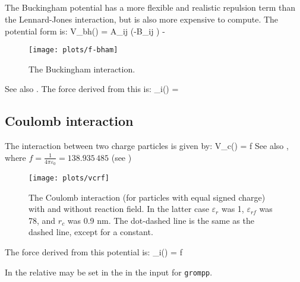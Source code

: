 \subsection{}
The Buckingham
potential has a more flexible and realistic repulsion term
than the Lennard-Jones interaction, but is also more expensive to
compute. The potential form is:
\beq
V_{bh}(\rij) = A_{ij} \exp(-B_{ij} \rij) -
\eeq
\begin{figure}
\centerline{\texttt{[image: plots/f-bham]}}
\caption {The Buckingham interaction.}
\label{fig:bham}
\end{figure}

See also .  The force derived from this is:
\beq
 _i(\rij) =  \rnorm
\eeq


\subsection{Coulomb interaction}
\label{sec:coul}
\newcommand{\epsr}{\varepsilon_r}
\newcommand{\epsrf}{\varepsilon_{rf}}
The  interaction between two charge particles is given by:
\beq
V_c(\rij) = f \frac{q_i q_j}{\epsr \rij}
\label{eqn:vcoul}
\eeq
See also , where $f = \frac{1}{4\pi \varepsilon_0} =
138.935\,485$ (see )

\begin{figure}
\centerline{\texttt{[image: plots/vcrf]}}
\caption[The Coulomb interaction with and without reaction field.]{The
Coulomb interaction (for particles with equal signed charge) with and
without reaction field. In the latter case $\epsr$ was 1, $\epsrf$ was 78,
and $r_c$ was 0.9 nm.
The dot-dashed line is the same as the dashed line, except for a constant.}
\label{fig:coul}
\end{figure}

The force derived from this potential is:
\beq
{}_i(\rvij) = f \frac{q_i q_j}{\epsr\rij^2}\rnorm
\eeq

In {\gromacs} the  relative  
\normindex{$\epsr$}
may be set in the in the input for {\tt grompp}. 

